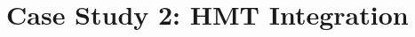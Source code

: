 \documentclass[conference]{IEEEtran}
\begin{document}
\section{Case Study 2: HMT Integration} 




\end{document}
